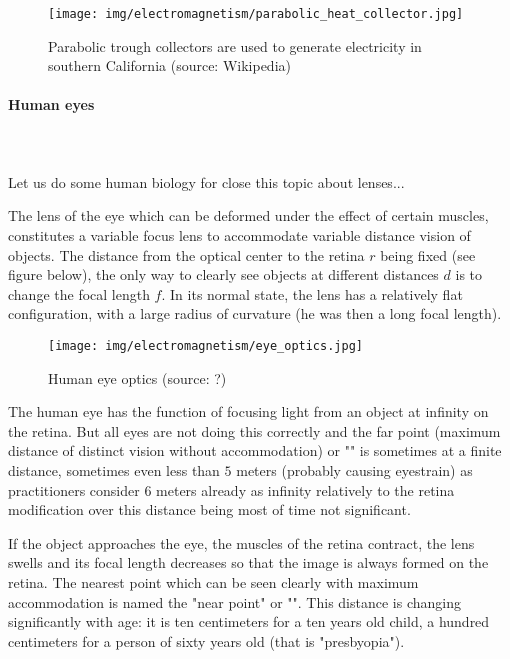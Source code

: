 	\begin{figure}[H]
		\centering
		\texttt{[image: img/electromagnetism/parabolic\_heat\_collector.jpg]}
		\caption[Parabolic trough collectors used to generate electricity in southern California]{Parabolic trough collectors are used to generate electricity in southern California (source: Wikipedia)}
	\end{figure}
	
	
	\pagebreak
	\paragraph{Human eyes}\mbox{}\\\\
	Let us do some human biology for close this topic about lenses...

	The lens of the eye which can be deformed under the effect of certain muscles, constitutes a variable focus lens to accommodate variable distance vision of objects. The distance from the optical center to the retina $r$ being fixed (see figure below), the only way to clearly see objects at different distances $d$ is to change the focal length $f$. In its normal state, the lens has a relatively flat configuration, with a large radius of curvature (he was then a long focal length).
	\begin{figure}[H]
		\centering
		\texttt{[image: img/electromagnetism/eye\_optics.jpg]}
		\caption[Human eye optics]{Human eye optics (source: ?)}
	\end{figure}
	The human eye has the function of focusing light from an object at infinity on the retina. But all eyes are not doing this correctly and the far point (maximum distance of distinct vision without accommodation) or "" is sometimes at a finite distance, sometimes even less than $5$ meters (probably causing eyestrain) as practitioners consider $6$ meters already as infinity relatively to the retina modification over this distance being most of time not significant.
	
	If the object approaches the eye, the muscles of the retina contract, the lens swells and its focal length decreases so that the image is always formed on the retina. The nearest point which can be seen clearly with maximum accommodation is named the "near point" or "". This distance is changing significantly with age: it is ten centimeters for a ten years old child, a hundred centimeters for a person of sixty years old (that is "presbyopia").
	
